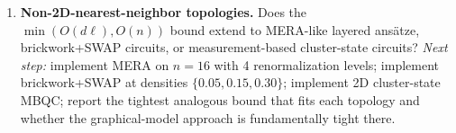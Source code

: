 \begin{enumerate}
\item \textbf{Non-2D-nearest-neighbor topologies.} Does the
$\min(O(d\ell), O(n))$ bound extend to MERA-like layered ans\"atze,
brickwork+SWAP circuits, or measurement-based cluster-state circuits?
\emph{Next step:} implement MERA on $n{=}16$ with 4 renormalization levels;
implement brickwork+SWAP at densities $\{0.05, 0.15, 0.30\}$; implement 2D
cluster-state MBQC; report the tightest analogous bound that fits each
topology and whether the graphical-model approach is fundamentally tight
there.
\end{enumerate}
